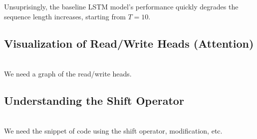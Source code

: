 \documentclass{amsart}
\numberwithin{equation}{section}
\theoremstyle{definition}
\theoremstyle{remark}
\begin{document}
Unsuprisingly, the baseline LSTM model's performance quickly degrades
the sequence length increases, starting from $T=10$.\\


\subsection{Visualization of Read/Write Heads (Attention)} \\

We need a graph of the read/write heads. \\

\subsection{Understanding the Shift Operator} \\

We need the snippet of code using the shift operator, modification, etc. \\
\end{document}
